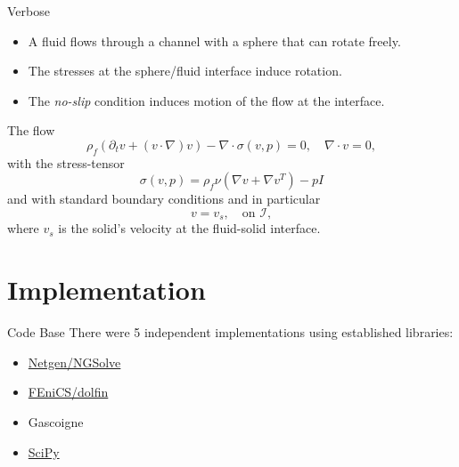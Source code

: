 \begin{frame}{Verbose}
\protect\hypertarget{verbose}{}
\begin{itemize}
\tightlist
\item
  A fluid flows through a channel with a sphere that can rotate freely.
\item
  The stresses at the sphere/fluid interface induce rotation.
\item
  The \emph{no-slip} condition induces motion of the flow at the
  interface.
\end{itemize}
\end{frame}

\begin{frame}
\begin{block}{The flow}
\protect\hypertarget{the-flow}{}
\begin{equation*}
        \rho_f\left(\partial_t v + (v \cdot\nabla)v \right) - \nabla \cdot \sigma(v ,p) = 0, \quad \nabla\cdot v  = 0,
\end{equation*} with the stress-tensor \begin{equation*}
    \sigma (v,p) = \rho _ f\nu\left( \nabla v+\nabla v^T \right) - p I
\end{equation*} and with standard boundary conditions and in particular
\begin{equation*}
    v = v_s, \quad \text{on } \mathcal I,
\end{equation*} where \(v_s\) is the solid's velocity at the fluid-solid
interface.
\end{block}
\end{frame}

\hypertarget{implementation}{%
\section{Implementation}\label{implementation}}

\begin{frame}{Code Base}
\protect\hypertarget{code-base}{}
There were 5 independent implementations using established libraries:

\begin{itemize}
\tightlist
\item
  \href{https://ngsolve.org/}{Netgen/NGSolve}
\item
  \href{https://fenicsproject.org/download/}{FEniCS/dolfin}
\item
  Gascoigne
\item
  \href{https://www.scipy.org}{SciPy}
\end{itemize}
\end{frame}


